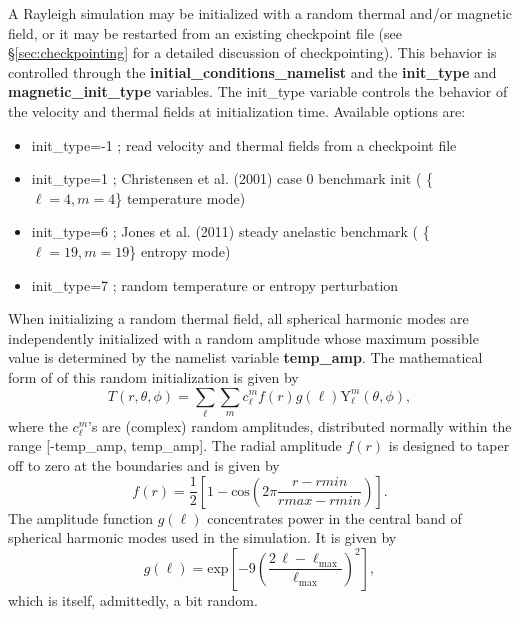 A Rayleigh simulation may be initialized with a random thermal and/or magnetic field, or it may be restarted from an existing checkpoint file (see \S \ref{sec:checkpointing} for a detailed discussion of checkpointing).  This behavior is controlled through the \textbf{initial\_conditions\_namelist} and the \textbf{init\_type} and \textbf{magnetic\_init\_type} variables.  The init\_type variable controls the behavior of the velocity and thermal fields at initialization time.  Available options are:
\begin{itemize}
\item init\_type=-1 ; read velocity and thermal fields from a checkpoint file
\item init\_type=1 ; Christensen et al. (2001) case 0 benchmark init ( \{$\ell=4,m=4$\} temperature mode)
\item init\_type=6 ; Jones et al. (2011) steady anelastic benchmark ( \{$\ell=19,m=19$\} entropy mode)
\item init\_type=7 ; random temperature or entropy perturbation
\end{itemize}
When initializing a random thermal field, all spherical harmonic modes are independently initialized with a random amplitude whose maximum possible value is determined by the namelist variable \textbf{temp\_amp}.  The mathematical form of of this random initialization is given by
\begin{equation}
\label{eq:init}
T(r,\theta,\phi) = \sum_\ell \sum_m  c_\ell^m f(r)g(\ell)\mathrm{Y}_\ell^m(\theta,\phi),
\end{equation}
where the $c_\ell^m$'s are (complex) random amplitudes, distributed normally within the range [-temp\_amp, temp\_amp].  The radial amplitude $f(r)$ is designed to taper off to zero at the boundaries and is given by
\begin{equation}
f(r) = \frac{1}{2}\left[1-\mathrm{cos}\left( 2\pi\frac{r-rmin}{rmax-rmin} \right)   \right].
\end{equation}
The amplitude function $g(\ell)$ concentrates power in the central band of spherical harmonic modes used in the simulation. It is given by
\begin{equation}
g(\ell) = \mathrm{exp}\left[  - 9\left( \frac{ 2\,\ell-\ell_\mathrm{max} }{ \ell_\mathrm{max} }  \right)^2 \right],
\end{equation}
which is itself, admittedly, a bit random.


